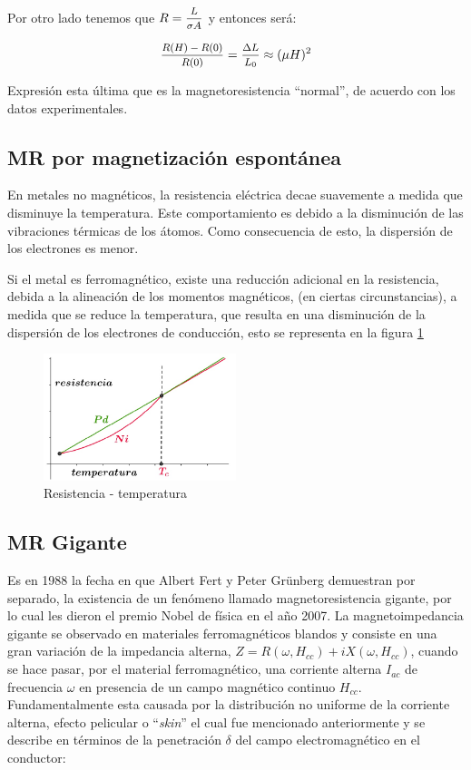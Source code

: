 Por otro lado tenemos que $R=\mfrac{L}{\sigma A}$ y entonces será:

\begin{equation}
	\mfrac{R(H)-R(0)}{R(0)} = \mfrac{\Delta L}{L_{0}} \approx (\mu H)^{2}
\end{equation}

Expresión esta última que es la magnetoresistencia “normal”, de acuerdo con los datos experimentales.

\subsection{MR por magnetización espontánea}

En metales no magnéticos, la resistencia eléctrica decae suavemente a medida que disminuye la temperatura. Este comportamiento es debido a la disminución de las vibraciones térmicas de los átomos. Como consecuencia de esto, la dispersión de los electrones es menor.

Si el metal es ferromagnético, existe una reducción adicional en la resistencia, debida a la alineación de los momentos magnéticos, (en ciertas circunstancias), a medida que se reduce la temperatura, que resulta en una disminución de la dispersión de los electrones de conducción, esto se representa en la figura \ref{fig:321}

\begin{figure}[H]
    \centering
    \includegraphics[width=0.5\textwidth]{./Figures/fig321}
	\caption{Resistencia - temperatura}
	\label{fig:321}
\end{figure}


\subsection{MR Gigante}

Es en 1988 la fecha en que Albert Fert y Peter Grünberg demuestran por separado, la existencia de un fenómeno llamado magnetoresistencia gigante, por lo cual les dieron el premio Nobel de física en el año 2007. La magnetoimpedancia gigante se observado en materiales ferromagnéticos blandos y consiste en una gran variación de la impedancia alterna, ${Z= R(\omega, H_{cc}) + iX(\omega, H_{cc})}$, cuando se hace pasar, por el material ferromagnético, una corriente alterna $I_{ac}$ de frecuencia $\omega$ en presencia de un campo magnético continuo $H_{cc}$. Fundamentalmente esta causada por la distribución no uniforme de la corriente alterna, efecto pelicular o “\textit{skin}” el cual fue mencionado anteriormente y se describe en términos de la  penetración $\delta$ del campo electromagnético en el conductor:



